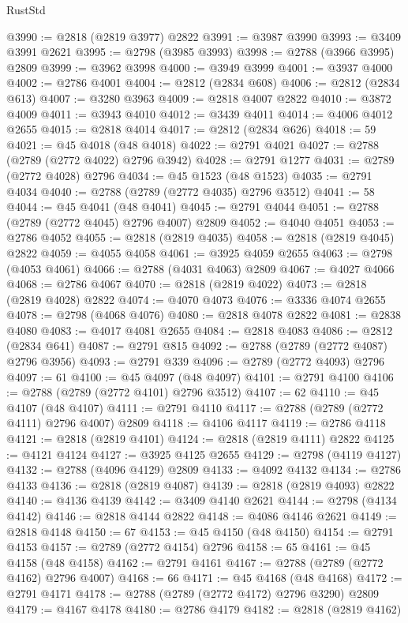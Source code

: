 \begin{lexlean}{RustStd}
\begin{coremodule}
@3990 := @2818 (@2819 @3977) @2822
@3991 := @3987 @3990
@3993 := @3409 @3991 @2621
@3995 := @2798 (@3985 @3993)
@3998 := @2788 (@3966 @3995) @2809
@3999 := @3962 @3998
@4000 := @3949 @3999
@4001 := @3937 @4000
@4002 := @2786 @4001
@4004 := @2812 (@2834 @608)
@4006 := @2812 (@2834 @613)
@4007 := @3280 @3963
@4009 := @2818 @4007 @2822
@4010 := @3872 @4009
@4011 := @3943 @4010
@4012 := @3439 @4011
@4014 := @4006 @4012 @2655
@4015 := @2818 @4014
@4017 := @2812 (@2834 @626)
@4018 := 59
@4021 := @45 @4018 (@48 @4018)
@4022 := @2791 @4021
@4027 := @2788 (@2789 (@2772 @4022) @2796 @3942)
@4028 := @2791 @1277
@4031 := @2789 (@2772 @4028) @2796
@4034 := @45 @1523 (@48 @1523)
@4035 := @2791 @4034
@4040 := @2788 (@2789 (@2772 @4035) @2796 @3512)
@4041 := 58
@4044 := @45 @4041 (@48 @4041)
@4045 := @2791 @4044
@4051 := @2788 (@2789 (@2772 @4045) @2796 @4007) @2809
@4052 := @4040 @4051
@4053 := @2786 @4052
@4055 := @2818 (@2819 @4035)
@4058 := @2818 (@2819 @4045) @2822
@4059 := @4055 @4058
@4061 := @3925 @4059 @2655
@4063 := @2798 (@4053 @4061)
@4066 := @2788 (@4031 @4063) @2809
@4067 := @4027 @4066
@4068 := @2786 @4067
@4070 := @2818 (@2819 @4022)
@4073 := @2818 (@2819 @4028) @2822
@4074 := @4070 @4073
@4076 := @3336 @4074 @2655
@4078 := @2798 (@4068 @4076)
@4080 := @2818 @4078 @2822
@4081 := @2838 @4080
@4083 := @4017 @4081 @2655
@4084 := @2818 @4083
@4086 := @2812 (@2834 @641)
@4087 := @2791 @815
@4092 := @2788 (@2789 (@2772 @4087) @2796 @3956)
@4093 := @2791 @339
@4096 := @2789 (@2772 @4093) @2796
@4097 := 61
@4100 := @45 @4097 (@48 @4097)
@4101 := @2791 @4100
@4106 := @2788 (@2789 (@2772 @4101) @2796 @3512)
@4107 := 62
@4110 := @45 @4107 (@48 @4107)
@4111 := @2791 @4110
@4117 := @2788 (@2789 (@2772 @4111) @2796 @4007) @2809
@4118 := @4106 @4117
@4119 := @2786 @4118
@4121 := @2818 (@2819 @4101)
@4124 := @2818 (@2819 @4111) @2822
@4125 := @4121 @4124
@4127 := @3925 @4125 @2655
@4129 := @2798 (@4119 @4127)
@4132 := @2788 (@4096 @4129) @2809
@4133 := @4092 @4132
@4134 := @2786 @4133
@4136 := @2818 (@2819 @4087)
@4139 := @2818 (@2819 @4093) @2822
@4140 := @4136 @4139
@4142 := @3409 @4140 @2621
@4144 := @2798 (@4134 @4142)
@4146 := @2818 @4144 @2822
@4148 := @4086 @4146 @2621
@4149 := @2818 @4148
@4150 := 67
@4153 := @45 @4150 (@48 @4150)
@4154 := @2791 @4153
@4157 := @2789 (@2772 @4154) @2796
@4158 := 65
@4161 := @45 @4158 (@48 @4158)
@4162 := @2791 @4161
@4167 := @2788 (@2789 (@2772 @4162) @2796 @4007)
@4168 := 66
@4171 := @45 @4168 (@48 @4168)
@4172 := @2791 @4171
@4178 := @2788 (@2789 (@2772 @4172) @2796 @3290) @2809
@4179 := @4167 @4178
@4180 := @2786 @4179
@4182 := @2818 (@2819 @4162)

\end{coremodule}
\end{lexlean}
